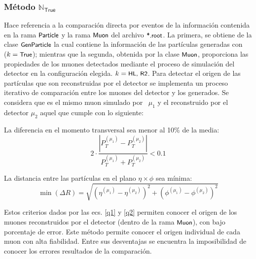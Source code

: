 \subsubsection{Método $\mathbb{N}_\textsf{True}$}
Hace referencia a la comparación directa por eventos de la información contenida en la rama $\textsf{\small Particle}$ y la rama $\textsf{\small Muon}$ del archivo $\textsf{\small *.root}$. La primera, se obtiene de la clase $\textsf{\small GenParticle}$ la cual contiene la información de las partículas generadas con \MC ~ ($k=\textsf{\small True}$); mientras que la segunda, obtenida por la clase $\textsf{\small Muon}$, proporciona las propiedades de los muones detectados mediante el proceso de simulación del detector en la configuración elegida. $k=\textsf{\small HL, R2}$. %
Para detectar el origen de las partículas que son reconstruidas por el detector se implementa un proceso iterativo de comparación entre los muones del detector y los generados. Se considera que es el mismo muon simulado por \MC~$\mu_1$ y el reconstruido por el detector $\mu_2$ aquel que cumple con lo siguiente: 
\begin{itemize_f}
\item La diferencia en el momento transversal sea menor al 10\% de la media:
\begin{equation}\label{q1}
2\cdot \dfrac{\left|P_T^{(\mu_1)}-P_T^{(\mu_2)}\right|}{P_T^{(\mu_1)}+P_T^{(\mu_2)}} < 0.1
\end{equation} 
\item La distancia entre las partículas en el plano $\eta \times \phi$ sea mínima:
\begin{equation}\label{q2}
\min{(\Delta R)} = \sqrt{\left(\eta^{(\mu_1)} - \eta^{(\mu_2)}\right)^2 + \left(\phi^{(\mu_1)} - \phi^{(\mu_2)}\right)^2}
\end{equation}
\end{itemize_f} 
Estos criterios dados por las ecs. \ref{q1} y \ref{q2} permiten conocer el origen de los muones reconstruidos por el detector (dentro de la rama $\textsf{\small Muon}$), con bajo porcentaje de error. Este método permite conocer el origen individual de cada muon con alta fiabilidad. Entre sus desventajas se encuentra la imposibilidad de conocer los errores resultados de la comparación. %

